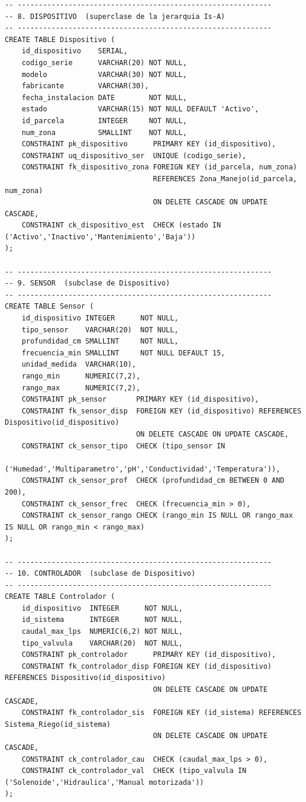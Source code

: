 \documentclass[11pt,letterpaper]{article}
\begin{document}
\begin{lstlisting}[style=sql, title={01\_ddl.sql}]
-- ------------------------------------------------------------
-- 8. DISPOSITIVO  (superclase de la jerarquia Is-A)
-- ------------------------------------------------------------
CREATE TABLE Dispositivo (
    id_dispositivo    SERIAL,
    codigo_serie      VARCHAR(20) NOT NULL,
    modelo            VARCHAR(30) NOT NULL,
    fabricante        VARCHAR(30),
    fecha_instalacion DATE        NOT NULL,
    estado            VARCHAR(15) NOT NULL DEFAULT 'Activo',
    id_parcela        INTEGER     NOT NULL,
    num_zona          SMALLINT    NOT NULL,
    CONSTRAINT pk_dispositivo      PRIMARY KEY (id_dispositivo),
    CONSTRAINT uq_dispositivo_ser  UNIQUE (codigo_serie),
    CONSTRAINT fk_dispositivo_zona FOREIGN KEY (id_parcela, num_zona)
                                   REFERENCES Zona_Manejo(id_parcela, num_zona)
                                   ON DELETE CASCADE ON UPDATE CASCADE,
    CONSTRAINT ck_dispositivo_est  CHECK (estado IN ('Activo','Inactivo','Mantenimiento','Baja'))
);

-- ------------------------------------------------------------
-- 9. SENSOR  (subclase de Dispositivo)
-- ------------------------------------------------------------
CREATE TABLE Sensor (
    id_dispositivo INTEGER      NOT NULL,
    tipo_sensor    VARCHAR(20)  NOT NULL,
    profundidad_cm SMALLINT     NOT NULL,
    frecuencia_min SMALLINT     NOT NULL DEFAULT 15,
    unidad_medida  VARCHAR(10),
    rango_min      NUMERIC(7,2),
    rango_max      NUMERIC(7,2),
    CONSTRAINT pk_sensor       PRIMARY KEY (id_dispositivo),
    CONSTRAINT fk_sensor_disp  FOREIGN KEY (id_dispositivo) REFERENCES Dispositivo(id_dispositivo)
                               ON DELETE CASCADE ON UPDATE CASCADE,
    CONSTRAINT ck_sensor_tipo  CHECK (tipo_sensor IN
        ('Humedad','Multiparametro','pH','Conductividad','Temperatura')),
    CONSTRAINT ck_sensor_prof  CHECK (profundidad_cm BETWEEN 0 AND 200),
    CONSTRAINT ck_sensor_frec  CHECK (frecuencia_min > 0),
    CONSTRAINT ck_sensor_rango CHECK (rango_min IS NULL OR rango_max IS NULL OR rango_min < rango_max)
);

-- ------------------------------------------------------------
-- 10. CONTROLADOR  (subclase de Dispositivo)
-- ------------------------------------------------------------
CREATE TABLE Controlador (
    id_dispositivo  INTEGER      NOT NULL,
    id_sistema      INTEGER      NOT NULL,
    caudal_max_lps  NUMERIC(6,2) NOT NULL,
    tipo_valvula    VARCHAR(20)  NOT NULL,
    CONSTRAINT pk_controlador      PRIMARY KEY (id_dispositivo),
    CONSTRAINT fk_controlador_disp FOREIGN KEY (id_dispositivo) REFERENCES Dispositivo(id_dispositivo)
                                   ON DELETE CASCADE ON UPDATE CASCADE,
    CONSTRAINT fk_controlador_sis  FOREIGN KEY (id_sistema) REFERENCES Sistema_Riego(id_sistema)
                                   ON DELETE CASCADE ON UPDATE CASCADE,
    CONSTRAINT ck_controlador_cau  CHECK (caudal_max_lps > 0),
    CONSTRAINT ck_controlador_val  CHECK (tipo_valvula IN ('Solenoide','Hidraulica','Manual motorizada'))
);


\end{lstlisting}
\end{document}
